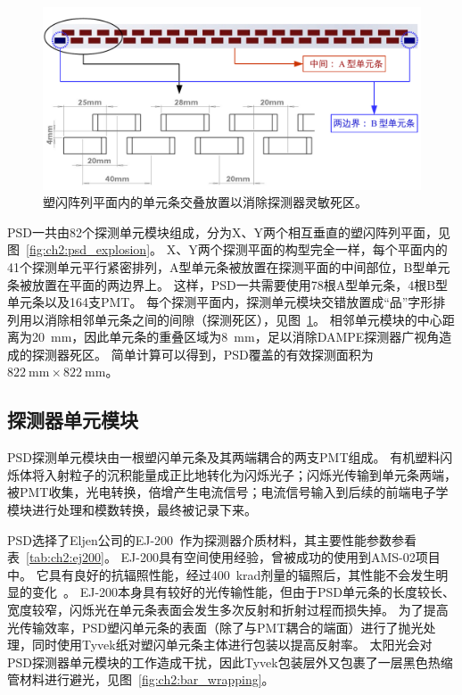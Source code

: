 \begin{figure}[h!]
	\centering
	\includegraphics[width=0.8\linewidth]{chap/description/fig/bars_layout}
	\caption{塑闪阵列平面内的单元条交叠放置以消除探测器灵敏死区。}
	\label{fig:ch2:bars_layout}
\end{figure}

PSD一共由82个探测单元模块组成，分为X、Y两个相互垂直的塑闪阵列平面，见图~\ref{fig:ch2:psd_explosion}。
X、Y两个探测平面的构型完全一样，每个平面内的41个探测单元平行紧密排列，A型单元条被放置在探测平面的中间部位，B型单元条被放置在平面的两边界上。
这样，PSD一共需要使用78根A型单元条，4根B型单元条以及164支PMT。
每个探测平面内，探测单元模块交错放置成“品”字形排列用以消除相邻单元条之间的间隙（探测死区），见图~\ref{fig:ch2:bars_layout}。
相邻单元模块的中心距离为\SI{20}{\milli\meter}，因此单元条的重叠区域为\SI{8}{\milli\meter}，足以消除DAMPE探测器广视角造成的探测器死区。
简单计算可以得到，PSD覆盖的有效探测面积为$\SI{822}{\milli\meter}\times\SI{822}{\milli\meter}$。

\subsection{探测器单元模块}
PSD探测单元模块由一根塑闪单元条及其两端耦合的两支PMT组成。
有机塑料闪烁体将入射粒子的沉积能量成正比地转化为闪烁光子；闪烁光传输到单元条两端，被PMT收集，光电转换，倍增产生电流信号；电流信号输入到后续的前端电子学模块进行处理和模数转换，最终被记录下来。

PSD选择了Eljen公司的EJ-200~\parencite{ej-200}作为探测器介质材料，其主要性能参数参看表~\ref{tab:ch2:ej200}。
EJ-200具有空间使用经验，曾被成功的使用到AMS-02项目中。
它具有良好的抗辐照性能，经过\SI{400}{\kilo\radian}剂量的辐照后，其性能不会发生明显的变化~\parencite{ams02_tof}。
EJ-200本身具有较好的光传输性能，但由于PSD单元条的长度较长、宽度较窄，闪烁光在单元条表面会发生多次反射和折射过程而损失掉。
为了提高光传输效率，PSD塑闪单元条的表面（除了与PMT耦合的端面）进行了抛光处理，同时使用Tyvek纸对塑闪单元条主体进行包装以提高反射率。
太阳光会对PSD探测器单元模块的工作造成干扰，因此Tyvek包装层外又包裹了一层黑色热缩管材料进行避光，见图~\ref{fig:ch2:bar_wrapping}。

